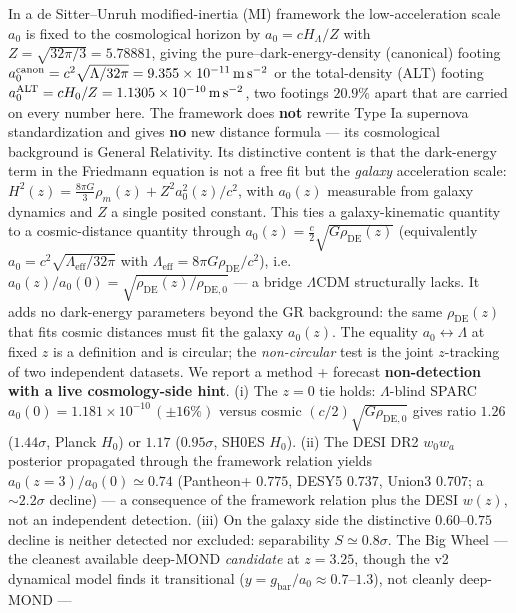 \documentclass[
]{article}
\begin{document}
In a de Sitter--Unruh modified-inertia (MI) framework the
low-acceleration scale \(a_0\) is fixed to the cosmological horizon by
\(a_0=cH_\Lambda/Z\) with \(Z=\sqrt{32\pi/3}=5.78881\), giving the
pure--dark-energy-density (canonical) footing
\(a_0^\mathrm{canon}=c^2\sqrt{\Lambda/32\pi}=9.355\times10^{-11}\,{\rm m\,s^{-2}}\)
or the total-density (ALT) footing
\(a_0^\mathrm{ALT}=cH_0/Z=1.1305\times10^{-10}\,{\rm m\,s^{-2}}\), two
footings \(20.9\%\) apart that are carried on every number here. The
framework does \textbf{not} rewrite Type Ia supernova standardization
and gives \textbf{no} new distance formula --- its cosmological
background is General Relativity. Its distinctive content is that the
dark-energy term in the Friedmann equation is not a free fit but the
\emph{galaxy} acceleration scale:
\(H^2(z)=\tfrac{8\pi G}{3}\rho_m(z)+Z^2a_0^2(z)/c^2\), with \(a_0(z)\)
measurable from galaxy dynamics and \(Z\) a single posited constant.
This ties a galaxy-kinematic quantity to a cosmic-distance quantity
through \(a_0(z)=\tfrac{c}{2}\sqrt{G\rho_\mathrm{DE}(z)}\) (equivalently
\(a_0=c^2\sqrt{\Lambda_\mathrm{eff}/32\pi}\) with
\(\Lambda_\mathrm{eff}=8\pi G\rho_\mathrm{DE}/c^2\)),
i.e.~\(a_0(z)/a_0(0)=\sqrt{\rho_\mathrm{DE}(z)/\rho_\mathrm{DE,0}}\) --- a
bridge \(\Lambda\)CDM structurally lacks. It adds no dark-energy
parameters beyond the GR background: the same \(\rho_\mathrm{DE}(z)\) that
fits cosmic distances must fit the galaxy \(a_0(z)\). The equality
\(a_0\!\leftrightarrow\!\Lambda\) at fixed \(z\) is a definition and is
circular; the \emph{non-circular} test is the joint \(z\)-tracking of
two independent datasets. We report a method + forecast
\textbf{non-detection with a live cosmology-side hint}. (i) The \(z=0\)
tie holds: \(\Lambda\)-blind SPARC
\(a_0(0)=1.181\times10^{-10}\,(\pm16\%)\) versus cosmic
\((c/2)\sqrt{G\rho_\mathrm{DE,0}}\) gives ratio \(1.26\) (\(1.44\sigma\),
Planck \(H_0\)) or \(1.17\) (\(0.95\sigma\), SH0ES \(H_0\)). (ii) The
DESI DR2 \(w_0w_a\) posterior propagated through the framework relation
yields \(a_0(z{=}3)/a_0(0)\simeq0.74\) (Pantheon+ \(0.775\), DESY5
\(0.737\), Union3 \(0.707\); a \(\sim2.2\sigma\) decline) --- a
consequence of the framework relation plus the DESI \(w(z)\), not an
independent detection. (iii) On the galaxy side the distinctive
\(0.60\)--\(0.75\) decline is neither detected nor excluded:
separability \(S\simeq0.8\sigma\). The Big Wheel --- the cleanest
available deep-MOND \emph{candidate} at \(z=3.25\), though the v2
dynamical model finds it transitional
(\(y=g_\mathrm{bar}/a_0\approx0.7\)--\(1.3\)), not cleanly deep-MOND ---
\end{document}
